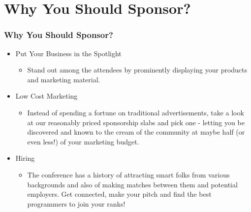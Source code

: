 \documentclass[10pt, compress, aspectratio=169]{beamer}
\begin{document}
\section{Why You Should Sponsor?}

\begin{frame}[fragile]
  \frametitle{Why You Should Sponsor?}
      \begin{itemize}
          \item \alert{Put Your Business in the Spotlight}
            \begin{itemize}
                \item \small{Stand out among the attendees by prominently displaying your products and marketing material.}
            \end{itemize}
          \item \alert{Low Cost Marketing}
          \begin{itemize}
              \item \small{Instead of spending a fortune on traditional advertisements, take a look at our reasonably priced sponsorship slabs and pick one - letting you be discovered and known to the cream of the community at maybe half (or even less!) of your marketing budget.}
          \end{itemize}
          \item \alert{Hiring}
          \begin{itemize}
              \item The conference has a history of attracting smart folks from various backgrounds and also of making matches between them and potential employers. Get connected, make your pitch and find the best programmers to join your ranks!
          \end{itemize}
      \end{itemize}
\end{frame}
\end{document}
